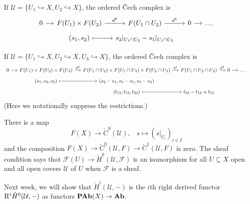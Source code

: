 \begin{exmp}
If \(\mathcal U=\{U_1\hookrightarrow X,U_2\hookrightarrow X\}\), the ordered Čech complex is
\begin{equation*}
  \begin{tikzcd}[row sep=tiny, column sep=small]
    0 \ar[r] & F(U_1) \times F(U_2) \ar[r, "d^0"] & F(U_1\cap U_2) \ar[r, "d^1"] & 0 \ar[r] & \ldots \\
    & {(s_1,s_2)} \ar[r, mapsto] & s_2|_{U_1\cap U_2}-s_1|_{U_1\cap U_2}
  \end{tikzcd}
\end{equation*}
\end{exmp}

\begin{exmp}
If \(\mathcal U=\{U_1\hookrightarrow X,U_2\hookrightarrow X,U_3\hookrightarrow X\}\), the ordered Čech complex is
\begin{equation*}
  \small
  \begin{tikzcd}[row sep=tiny, column sep=small]
    0 \ar[r] & F(U_1) \times F(U_2) \times F(U_3) \ar[r, "d^0"] & F(U_1\cap U_2) \times F(U_1\cap U_3) \times F(U_2\cap U_3) \ar[r, "d^1"] & F(U_1\cap U_2\cap U_3) \ar[r, "d^2"] & 0 \ar[r] & \ldots \\
    & {(s_1,s_2,s_3)} \ar[r, mapsto] & {(s_2-s_1,s_3-s_1,s_3-s_2)} \\
    & & {(t_{12},t_{13},t_{23})} \ar[r, mapsto] & t_{23}-t_{13}+t_{12}
  \end{tikzcd}
\end{equation*}
(Here we notationally suppress the restrictions.)
\end{exmp}

\begin{rmk}
There is a map
\[ F(X) \to \check{C}^0(\mathcal U)\text{,} \quad s\mapsto (s|_{U_i})_{i\in I} \]
and the composition \(F(X)\to\check{C}^0(\mathcal U,F)\to\check{C}^1(\mathcal U,F)\) is zero.
The sheaf condition says that \(\mathcal F(U)\to\check{H}^0(\mathcal U,\mathcal F)\) is an isomorphism for all \(U\subseteq X\) open and all open covers \(\mathcal U\) of \(U\) when \(\mathcal F\) is a sheaf.
\end{rmk}

Next week, we will show that \(\check{H}^i(\mathcal U,-)\) is the \(i\)th right derived functor \(\mathrm{R}^i\check{H}^0(\mathcal U,-)\) as functors \(\operatorname{\mathbf{PAb}}(X)\to\mathbf{Ab}\).

